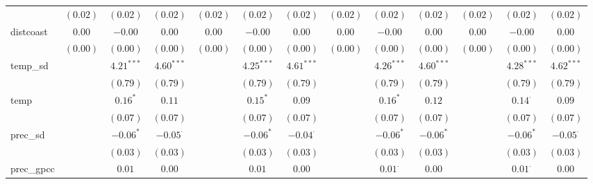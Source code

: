 \begin{sidewaystable}
\begin{center}
{\begin{tabular}{l c c c c c c c c c c c c}
                    & $(0.02)$      & $(0.02)$        & $(0.02)$        & $(0.02)$      & $(0.02)$        & $(0.02)$        & $(0.02)$      & $(0.02)$        & $(0.02)$       & $(0.02)$        & $(0.02)$        & $(0.02)$        \\
distcoast           & $0.00$        & $-0.00$         & $0.00$          & $0.00$        & $-0.00$         & $0.00$          & $0.00$        & $-0.00$         & $0.00$         & $0.00$          & $-0.00$         & $0.00$          \\
                    & $(0.00)$      & $(0.00)$        & $(0.00)$        & $(0.00)$      & $(0.00)$        & $(0.00)$        & $(0.00)$      & $(0.00)$        & $(0.00)$       & $(0.00)$        & $(0.00)$        & $(0.00)$        \\
temp\_sd            &               & $4.21^{***}$    & $4.60^{***}$    &               & $4.25^{***}$    & $4.61^{***}$    &               & $4.26^{***}$    & $4.60^{***}$   &                 & $4.28^{***}$    & $4.62^{***}$    \\
                    &               & $(0.79)$        & $(0.79)$        &               & $(0.79)$        & $(0.79)$        &               & $(0.79)$        & $(0.79)$       &                 & $(0.79)$        & $(0.79)$        \\
temp                &               & $0.16^{*}$      & $0.11$          &               & $0.15^{*}$      & $0.09$          &               & $0.16^{*}$      & $0.12$         &                 & $0.14^{\cdot}$  & $0.09$          \\
                    &               & $(0.07)$        & $(0.07)$        &               & $(0.07)$        & $(0.07)$        &               & $(0.07)$        & $(0.07)$       &                 & $(0.07)$        & $(0.07)$        \\
prec\_sd            &               & $-0.06^{*}$     & $-0.05^{\cdot}$ &               & $-0.06^{*}$     & $-0.04^{\cdot}$ &               & $-0.06^{*}$     & $-0.06^{*}$    &                 & $-0.06^{*}$     & $-0.05^{\cdot}$ \\
                    &               & $(0.03)$        & $(0.03)$        &               & $(0.03)$        & $(0.03)$        &               & $(0.03)$        & $(0.03)$       &                 & $(0.03)$        & $(0.03)$        \\
prec\_gpcc          &               & $0.01$          & $0.00$          &               & $0.01$          & $0.00$          &               & $0.01^{\cdot}$  & $0.00$         &                 & $0.01^{\cdot}$  & $0.00$          \\

\end{tabular}}
\end{center}
\end{sidewaystable}
